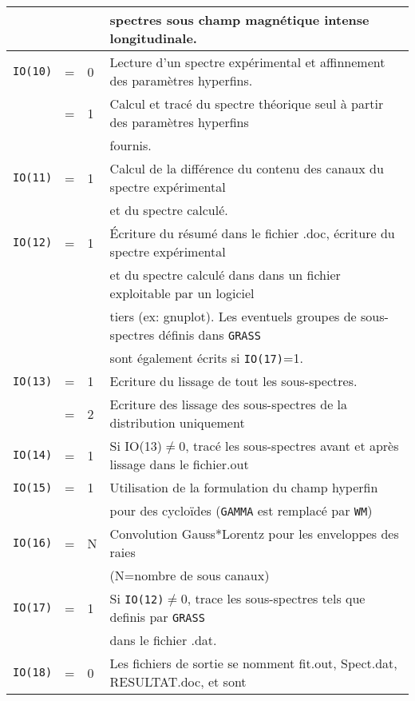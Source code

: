 \begin{table}
\begin{tabular}{|rcl|l|}
                  & &   &spectres sous champ magnétique intense longitudinale.\\
\hline  
\lstinline{IO(10)}&=& 0 & Lecture d'un spectre expérimental et affinnement des paramètres hyperfins. \\
                  &=& 1 & Calcul et tracé du spectre théorique seul à partir des paramètres hyperfins\\
                  & &   & fournis. \\
\hline  
\lstinline{IO(11)}&=& 1 & Calcul de la différence du contenu des canaux du spectre expérimental\\
                  & &  & et du spectre calculé.\\
\hline  
\lstinline{IO(12)}&=& 1 & \'Ecriture du résumé dans le fichier .doc, écriture du spectre expérimental\\
                  & &   & et du spectre calculé dans dans un fichier exploitable par un logiciel\\
                  & &   &  tiers (ex: gnuplot). Les eventuels groupes de sous-spectres définis dans \lstinline{GRASS}\\
                  & &   &  sont également écrits si \lstinline{IO(17)}=1.\\
\hline  
\lstinline{IO(13)}&=& 1 & Ecriture du lissage de tout les sous-spectres. \\
                  &=& 2 & Ecriture des lissage des sous-spectres de la distribution uniquement \\
\hline  
\lstinline{IO(14)}&=& 1 & Si IO(13)$\neq$0, tracé les sous-spectres avant et après lissage dans le fichier.out \\
\hline  
\lstinline{IO(15)}&=& 1 & Utilisation de la formulation du champ hyperfin \\
                  & &   & pour des cycloïdes (\lstinline{GAMMA} est remplacé par \lstinline{WM})\\
\hline
\lstinline{IO(16)}&=& N & Convolution Gauss*Lorentz pour les enveloppes des raies\\
                  & &  & (N=nombre de sous canaux)\\
\hline  
\lstinline{IO(17)}&=& 1 & Si \lstinline{IO(12)}$\neq$0, trace les sous-spectres tels que definis par \lstinline{GRASS}\\
                  & &   & dans le fichier .dat. \\
\hline  
\lstinline{IO(18)}&=& 0 & Les fichiers de sortie se nomment fit.out, Spect.dat, RESULTAT.doc, et sont\\

\end{tabular}
\end{table}
